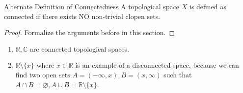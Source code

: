 \begin{Definition}{Alternate Definition of Connectedness}\label{alternative_connectedness}
    A topological space $X$ is defined as connected if there exists NO non-trivial clopen sets.
\end{Definition}
\begin{proof}
    Formalize the arguments before in this section.
\end{proof}
\begin{Example}
    \begin{enumerate}
        \item $\mathbb{R, C}$ are connected topological spaces.
        \item $\mathbb{R}\setminus\{x\}$ where $x\in\mathbb{R}$ is an example of a disconnected space, because we can find two open sets \newline $A=(-\infty,x),B=(x,\infty)$ such that $A\cap B=\varnothing, A\cup B=\mathbb{R}\setminus\{x\}$. 
    \end{enumerate}
\end{Example}
